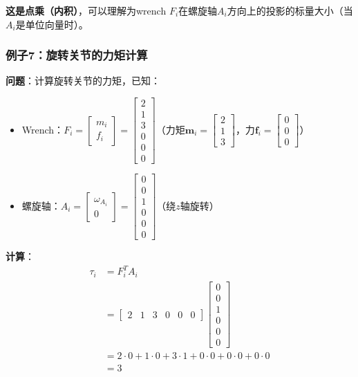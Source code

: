\documentclass[12pt,a4paper]{article}
\begin{document}
\textbf{这是点乘（内积）}，可以理解为wrench $F_i$在螺旋轴$A_i$方向上的投影的标量大小（当$A_i$是单位向量时）。

\subsubsection{例子7：旋转关节的力矩计算}

\textbf{问题}：计算旋转关节的力矩，已知：
\begin{itemize}
\item Wrench：$F_i = \begin{bmatrix} m_i \\ f_i \end{bmatrix} = \begin{bmatrix} 2 \\ 1 \\ 3 \\ 0 \\ 0 \\ 0 \end{bmatrix}$（力矩$\bm{m}_i = \begin{bmatrix} 2 \\ 1 \\ 3 \end{bmatrix}$，力$\bm{f}_i = \begin{bmatrix} 0 \\ 0 \\ 0 \end{bmatrix}$）
\item 螺旋轴：$A_i = \begin{bmatrix} \omega_{A_i} \\ 0 \end{bmatrix} = \begin{bmatrix} 0 \\ 0 \\ 1 \\ 0 \\ 0 \\ 0 \end{bmatrix}$（绕$z$轴旋转）
\end{itemize}

\textbf{计算}：
\begin{align}
\tau_i &= F_i^T A_i \\
&= \begin{bmatrix} 2 & 1 & 3 & 0 & 0 & 0 \end{bmatrix} \begin{bmatrix} 0 \\ 0 \\ 1 \\ 0 \\ 0 \\ 0 \end{bmatrix} \\
&= 2 \cdot 0 + 1 \cdot 0 + 3 \cdot 1 + 0 \cdot 0 + 0 \cdot 0 + 0 \cdot 0 \\
&= 3
\end{align}
\end{document}
